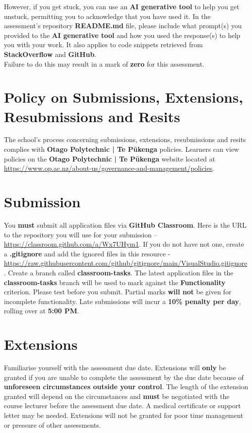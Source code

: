 \documentclass{article}
\begin{document}
 However, if you get stuck, you can use an \textbf{AI generative tool} to help you get unstuck, permitting you to acknowledge that you have used it. In the assessment's repository \textbf{README.md} file, please include what prompt(s) you provided to the \textbf{AI generative tool} and how you used the response(s) to help you with your work. It also applies to code snippets retrieved from \textbf{StackOverflow} and \textbf{GitHub}. \\
 
 Failure to do this may result in a mark of \textbf{zero} for this assessment. 

\section*{Policy on Submissions, Extensions, Resubmissions and Resits}
The school's process concerning submissions, extensions, resubmissions and resits complies with \textbf{Otago Polytechnic | Te Pūkenga} policies. Learners can view policies on the \textbf{Otago Polytechnic | Te Pūkenga} website located at \href{https://www.op.ac.nz/about-us/governance-and-management/policies}{https://www.op.ac.nz/about-us/governance-and-management/policies}.

\section*{Submission}
You \textbf{must} submit all application files via \textbf{GitHub Classroom}. Here is the URL to the repository you will use for your submission – \href{https://classroom.github.com/a/Wx7UHym1}{https://classroom.github.com/a/Wx7UHym1}. If you do not have not one, create a \textbf{.gitignore} and add the ignored files in this resource - \href{https://raw.githubusercontent.com/github/gitignore/main/VisualStudio.gitignore}{https://raw.githubusercontent.com/github/gitignore/main/VisualStudio.gitignore}. Create a branch called \textbf{classroom-tasks}. The latest application files in the \textbf{classroom-tasks} branch will be used to mark against the \textbf{Functionality} criterion. Please test before you submit. Partial marks \textbf{will not} be given for incomplete functionality. Late submissions will incur a \textbf{10\% penalty per day}, rolling over at \textbf{5:00 PM}.

\section*{Extensions}
Familiarise yourself with the assessment due date. Extensions will \textbf{only} be granted if you are unable to complete the assessment by the due date because of \textbf{unforeseen circumstances outside your control}. The length of the extension granted will depend on the circumstances and \textbf{must} be negotiated with the course lecturer before the assessment due date. A medical certificate or support letter may be needed. Extensions will not be granted for poor time management or pressure of other assessments.
\end{document}
